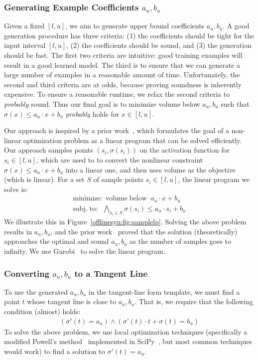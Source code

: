 \subsubsection{Generating Example Coefficients $ a_u, b_u $}
Given a fixed $ [l, u] $, we aim to generate upper bound coefficients $ a_u,
b_u $. A good generation procedure has three criteria: (1) the coefficients
should be tight for the input interval $ [l, u] $, (2) the coefficients should
be sound, and (3)
the generation should be fast. The first two criteria are intuitive: good training examples
will result in a good learned model. The third is to ensure that we can
generate a large number of examples in a reasonable amount of time.
Unfortunately, the second and third criteria are at odds, because proving
soundness is inherently expensive. To ensure a reasonable runtime, we relax the
second criteria to \textit{probably} sound. Thus our final goal is to minimize
volume below $ a_u, b_u $ such that $ \sigma(x) \leq a_u\cdot x + b_u $
\textit{probably} holds for $ x \in [l, u] $.

Our approach is inspired by a prior
work~\cite{ryou2021scalable,balunovic2019certifying}, which formulates the goal of a non-linear optimization problem
as a linear program that can be solved efficiently. Our approach samples points
$ (s_i, \sigma(s_i)) $ on the activation function for  $ s_i \in [l, u] $,
which are used to to convert the nonlinear constraint $ \sigma(x) \leq a_u\cdot
x + b_u $ into a linear one, and then uses volume as the objective (which is
linear). For a set $ S $ of sample points $ s_i \in [l, u] $, the
linear program we solve is:
\begin{gather*}
	\mathrm{minimize:} \; \mathrm{volume \;below}\;\; a_u\cdot x + b_u \\
	\mathrm{subj.\; to:} \;\; \bigwedge_{s_i \in S}
	\sigma(s_i) \leq a_u\cdot s_i + b_u
\end{gather*}
We illustrate this in Figure~\ref{offlinesyn:fig:samplelp}.
Solving the above problem results in $ a_u, b_u $, and the prior
work~\cite{ryou2021scalable,balunovic2019certifying} proved that the solution
(theoretically) approaches the optimal and sound $ a_u, b_u $ as the number of
samples goes to infinity. We use Gurobi~\cite{gurobi} to solve the linear
program.

\subsubsection{Converting $ a_u, b_u $ to a Tangent Line}
To use the generated $ a_u, b_u $ in the tangent-line form template,
we must find a point $ t $ whose tangent line is close to $ a_u, b_u $.
That is, we require that the following condition (almost) holds:
\begin{gather*}
	(\sigma'(t) = a_u) \wedge (\sigma'(t)\cdot t + \sigma(t) = b_u)
\end{gather*}
To solve the above problem, we use local optimization techniques (specifically a
modified Powell's method~\cite{powell1964efficient} implemented in
SciPy~\cite{2020SciPy-NMeth}, but most common techniques would work) to find a
solution to $ \sigma'(t) = a_u $.



